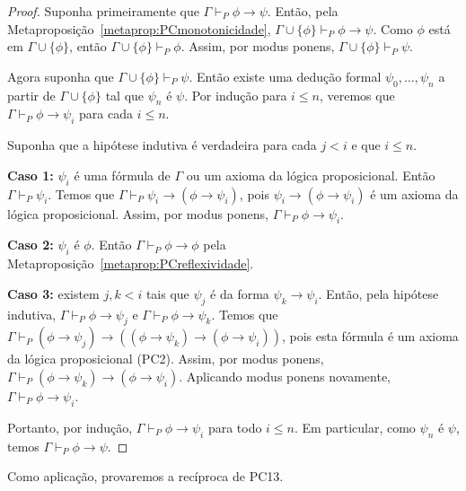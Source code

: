 \begin{proof}
    Suponha primeiramente que $\Gamma \vdash_P \phi \rightarrow \psi$.
    Então, pela Metaproposição~\ref{metaprop:PCmonotonicidade}, $\Gamma \cup \{\phi\} \vdash_P \phi \rightarrow \psi$.
    Como $\phi$ está em $\Gamma \cup \{\phi\}$, então $\Gamma \cup \{\phi\} \vdash_P \phi$.
    Assim, por modus ponens, $\Gamma \cup \{\phi\} \vdash_P \psi$.

    Agora suponha que $\Gamma \cup \{\phi\} \vdash_P \psi$.
    Então existe uma dedução formal $\psi_0, \dots, \psi_n$ a partir de $\Gamma \cup \{\phi\}$ tal que $\psi_n$ é $\psi$.
    Por indução para $i\leq n$, veremos que $\Gamma \vdash_P \phi \rightarrow \psi_i$ para cada $i\leq n$.

    Suponha que a hipótese indutiva é verdadeira para cada $j < i$ e que $i\leq n$.

    \textbf{Caso 1:} $\psi_i$ é uma fórmula de $\Gamma$ ou um axioma da lógica proposicional.
    Então $\Gamma \vdash_P \psi_i$.
    Temos que $\Gamma \vdash_P \psi_i \rightarrow (\phi \rightarrow \psi_i)$, pois $\psi_i \rightarrow (\phi \rightarrow \psi_i)$ é um axioma da lógica proposicional.
    Assim, por modus ponens, $\Gamma \vdash_P \phi \rightarrow \psi_i$.

    \textbf{Caso 2:} $\psi_i$ é $\phi$.
    Então $\Gamma \vdash_P \phi \rightarrow \phi$ pela Metaproposição~\ref{metaprop:PCreflexividade}.

    \textbf{Caso 3:} existem $j, k < i$ tais que $\psi_j$ é da forma $\psi_k \rightarrow \psi_i$.
    Então, pela hipótese indutiva, $\Gamma \vdash_P \phi \rightarrow \psi_j$ e $\Gamma \vdash_P \phi \rightarrow \psi_k$.
    Temos que $\Gamma \vdash_P (\phi \rightarrow \psi_j) \rightarrow ((\phi \rightarrow \psi_k) \rightarrow (\phi \rightarrow \psi_i))$, pois esta fórmula é um axioma da lógica proposicional (PC2).
    Assim, por modus ponens, $\Gamma \vdash_P (\phi \rightarrow \psi_k) \rightarrow (\phi \rightarrow \psi_i)$.
    Aplicando modus ponens novamente, $\Gamma \vdash_P \phi \rightarrow \psi_i$.

    Portanto, por indução, $\Gamma\vdash_P \phi\rightarrow \psi_i$ para todo $i\leq n$.
    Em particular, como $\psi_n$ é $\psi$, temos $\Gamma\vdash_P \phi\rightarrow\psi$.
\end{proof}

Como aplicação, provaremos a recíproca de PC13.

